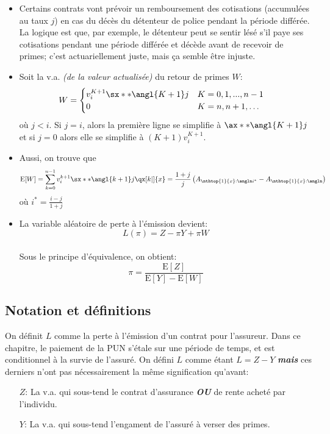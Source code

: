 \documentclass[10pt, french]{article}
\begin{document}
\begin{multicols*}{3}
\begin{itemize}
\item	Certains contrats vont prévoir un remboursement des cotisations (accumulées au taux $j$) en cas du décès du détenteur de police pendant la période différée.\\
		La logique est que, par exemple, le détenteur peut se sentir lésé s'il paye ses cotisations pendant une période différée et décède avant de recevoir de primes; c'est actuariellement juste, mais ça semble être injuste.
\item 	Soit la v.a. \textit{(de la valeur actualisée)} du retour de primes $W$:
\begin{align*}
	W 
	&=	\begin{cases}
			v^{K + 1}_{i} \sx**{\angl{K + 1}j} 	& 	K = 0, 1, ..., n - 1 \\
			0	&	K = n, n + 1, \dots	\\
		\end{cases}
\end{align*}
où $j < i$. Si $j = i$, alors la première ligne se simplifie à $\ax**{\angl{K + 1}j}$ et si $j = 0$ alors elle se simplifie à $(K + 1) v_{i}^{K + 1}$.
\item 	Aussi, on trouve que
\[
	\text{E}[W] 
	= 	\sum_{k=0}^{n - 1} v_i^{k+1} \sx**{\angl{k+1} j} \qx[k|]{x} 
	= 	\frac{1 + j}{j} \left( {A}_{\nthtop{1}{x}:\angln i^{*}} - A_{\nthtop{1}{x}:\angln}\right)
\]
où $i^{*} = \frac{i - j}{1 + j}$
\item	La variable aléatoire de perte à l'émission devient:
	\begin{equation*}
	L(\pi) = Z - \pi Y + \pi W
	\end{equation*}\\
		Sous le principe d'équivalence, on obtient:
	\begin{equation*}
	\pi = \frac{\text{E}[Z]}{\text{E}[Y] - \text{E}[W]}
	\end{equation*}
\end{itemize}

\setcounter{subsection}{0}
\subsection{Notation et définitions}
On définit $L$ comme la perte à l'émission d'un contrat pour l'assureur. Dans ce chapitre, le paiement de la PUN s'étale sur une période de temps, et est conditionnel à la survie de l'assuré. 
On défini $L$ comme étant $L = Z - Y$ \textit{\textbf{mais}} ces derniers n'ont pas nécessairement la même signification qu'avant:
\begin{itemize}
	\item[$Z$:] La v.a. qui sous-tend le contrat d'assurance \textbf{\textit{OU}} de rente acheté par l'individu.
	\item[$Y$:] La v.a. qui sous-tend l'engament de l'assuré à verser des primes.
\end{itemize}


\end{multicols*}
\end{document}
